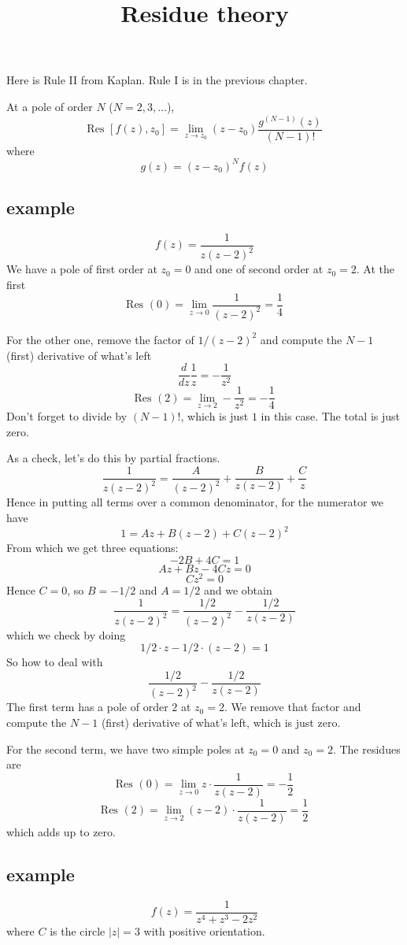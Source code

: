 \documentclass[11pt, oneside]{article}
\title{Residue theory}
\date{}
\begin{document}
\maketitle
\Large


Here is Rule II from Kaplan.  Rule I is in the previous chapter.

At a pole of order $N$ ($N = 2, 3, \dots$),
\[ \text{Res } [f(z),z_0] = \lim_{z \rightarrow z_0} (z-z_0) \frac{g^{(N-1)}(z)}{(N-1)!} \]
where 
\[ g(z) = (z-z_0)^N f(z) \]

\subsection*{example}
\[ f(z) = \frac{1}{z(z-2)^2} \]
We have a pole of first order at $z_0=0$ and one of second order at $z_0=2$.  At the first
\[ \text{Res }(0) = \lim_{z \rightarrow 0} \frac{1}{(z-2)^2} = \frac{1}{4} \]

For the other one, remove the factor of $1/(z-2)^2$ and compute the $N-1$ (first) derivative of what's left
\[ \frac{d}{dz} \frac{1}{z} =  - \frac{1}{z^2} \]
\[ \text{Res } (2) = \lim_{z \rightarrow 2} -\frac{1}{z^2} = -\frac{1}{4} \]
Don't forget to divide by $(N-1)!$, which is just $1$ in this case.  The total is just zero.

As a check, let's do this by partial fractions.
\[ \frac{1}{z(z-2)^2} = \frac{A}{(z-2)^2} +  \frac{B}{z(z-2)} +  \frac{C}{z}  \]
Hence in putting all terms over a common denominator, for the numerator we have
\[ 1 = Az + B(z-2) + C(z-2)^2 \]
From which we get three equations:
\[ -2B + 4C = 1 \]
\[ Az + Bz - 4Cz = 0 \]
\[ Cz^2 = 0 \]
Hence $C = 0$, so $B = -1/2$ and $A = 1/2$ and we obtain
\[ \frac{1}{z(z-2)^2} = \frac{1/2}{(z-2)^2} - \frac{1/2}{z(z-2)} \]
which we check by doing
\[ 1/2 \cdot z - 1/2 \cdot (z-2) = 1 \]
So how to deal with 
\[ \frac{1/2}{(z-2)^2} - \frac{1/2}{z(z-2)} \]
The first term has a pole of order $2$ at $z_0 = 2$.  We remove that factor and compute the $N-1$ (first) derivative of what's left, which is just zero.  

For the second term, we have two simple poles at $z_0=0$ and $z_0=2$.  The residues are
\[ \text{Res } (0) = \lim_{z \rightarrow 0} z \cdot \frac{1}{z(z-2)} = - \frac{1}{2} \]
\[ \text{Res } (2) = \lim_{z \rightarrow 2} (z-2) \cdot \frac{1}{z(z-2)} = \frac{1}{2} \]
which adds up to zero.

\subsection*{example}
\[ f(z) = \frac{1}{z^4 + z^3 - 2z^2} \]
where $C$ is the circle $|z| = 3$ with positive orientation.
\end{document}
